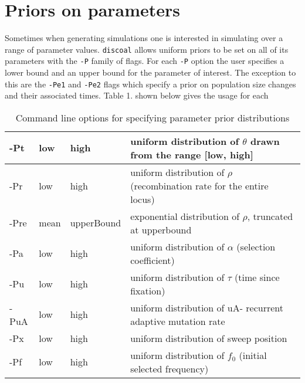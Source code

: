 \documentclass[12pt]{article}
\begin{document}
\section*{Priors on parameters}
Sometimes when generating simulations one is interested in simulating over a range of parameter values. \texttt{discoal} allows uniform priors to be set on all of its parameters with the \texttt{-P} family of flags. For each \texttt{-P} option the user specifies a lower bound and an upper bound for the parameter of interest. The exception to this are the \texttt{-Pe1} and \texttt{-Pe2} flags which specify a prior on population size changes and their associated times. Table 1. shown below gives the usage for each


\begin{table}[hb]
\centering
\caption{Command line options for specifying parameter prior distributions}
\label{priortable}
\begin{tabular}{|l|l|l|l|}
\hline
-Pt  & low  & high       & uniform distribution of $\theta$ drawn from the range [low, high]     \\ \hline
-Pr  & low  & high       & uniform distribution of $\rho$ (recombination rate for the entire locus)     \\ \hline
-Pre & mean & upperBound & exponential distribution of $\rho$, truncated at upperbound \\ \hline
-Pa  & low  & high       & uniform distribution of $\alpha$ (selection coefficient)              \\ \hline
-Pu  & low  & high       & uniform distribution of $\tau$  (time since fixation)                  \\ \hline
-PuA & low  & high       & uniform distribution of uA- recurrent adaptive mutation rate          \\ \hline
-Px  & low  & high       & uniform distribution of sweep position                                \\ \hline
-Pf  & low  & high       & uniform distribution of $f_0$  (initial selected frequency)            \\ \hline
\end{tabular}
\end{table}
\end{document}
